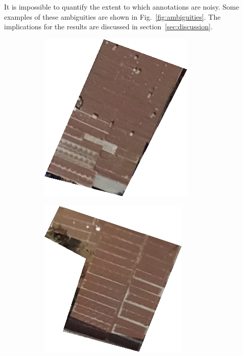 \documentclass[11pt]{article}
\begin{document}
	It is impossible to quantify the extent to which annotations are noisy. 
	Some examples of these ambiguities are shown in Fig.~\ref{fig:ambiguities}.
	The implications for the results are discussed in section~\ref{sec:discussion}.
	
	\begin{figure}
		\centering
		\begin{subfigure}[c]{0.31\textwidth}
			\centering
			\includegraphics[width=.72\textwidth]{figures/wrong_labels/hm_rusty.png}
		\end{subfigure}	
		\begin{subfigure}[c]{0.31\textwidth}
			\centering
			\includegraphics[width=.72\textwidth]{figures/wrong_labels/irr_rusty.png}

\end{subfigure}
\end{figure}
\end{document}
